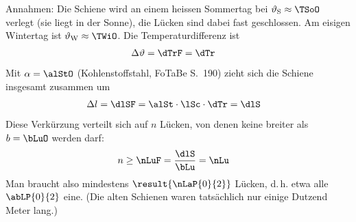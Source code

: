 \begin{center}
\end{center}

Annahmen: Die Schiene wird an einem heissen Sommertag bei $\vartheta_\mathrm{S} \approx \TSoO$ verlegt (sie liegt in der Sonne), die Lücken sind dabei fast geschlossen. Am eisigen Wintertag ist $\vartheta_\mathrm{W} \approx \TWiO$. Die Temperaturdifferenz ist
\begin{align}
 \Delta\vartheta &= \dTrF = \dTr
\end{align}
Mit $\alpha = \alStO$ (Kohlenstoffstahl, FoTaBe S.~190) zieht sich die Schiene insgesamt zusammen um
\begin{align}
 \Delta l &= \dlSF = \alSt\cdot\lSc\cdot\dTr = \dlS
\end{align}
Diese Verkürzung verteilt sich auf $n$ Lücken, von denen keine breiter als $b = \bLuO$ werden darf:
\begin{align}
 n &\geq \nLuF = \frac{\dlS}{\bLu} = \nLu
\end{align}
Man braucht also mindestens $\result{\nLaP{0}{2}}$ Lücken, d.\,h. etwa alle $\abLP{0}{2}$ eine. (Die alten Schienen waren tatsächlich nur einige Dutzend Meter lang.)
